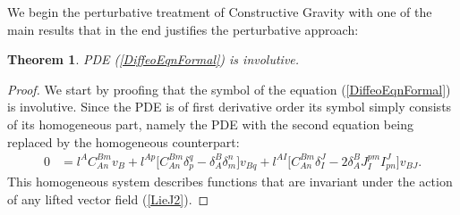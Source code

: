 \documentclass[a4paper,12pt, DIV=14, BCOR=5mm, twoside, headsepline, numbers=noenddot]{scrbook}
\newtheorem{theorem}{Theorem}[section]
\begin{document}
We begin the perturbative treatment of Constructive Gravity with one of the main results that in the end justifies the perturbative approach:
\begin{theorem}
PDE (\ref{DiffeoEqnFormal}) is involutive.
\end{theorem}
\begin{proof}
We start by proofing that the symbol of the equation (\ref{DiffeoEqnFormal}) is involutive. Since the PDE is of first derivative order its symbol simply consists of its homogeneous part, namely the PDE with the second equation being replaced by the homogeneous counterpart:
\begin{align}
    0 &= l^{A} C_{An}^{Bm} v_B + l^{Ap} \bigl[ C_{An}^{Bm} \delta_p^q - \delta_A^B \delta_m^n \bigr] v_{Bq} + l^{AI} \bigl[ C_{An}^{Bm} \delta_I^J - 2 \delta_A^B J_I^{pm} I^J_{pn}  \bigr] v_{BJ}.
\end{align}
This homogeneous system describes functions that are invariant under the action of any lifted vector field (\ref{LieJ2}). 


\end{proof}
\end{document}
